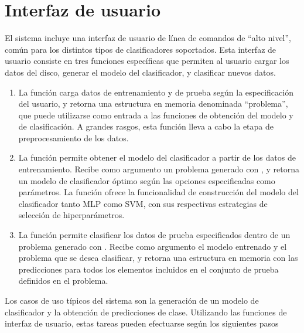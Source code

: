 %
%
%
\section{Interfaz de usuario}
%
El sistema incluye una interfaz de usuario de línea de comandos de
``alto nivel'', común para los distintos tipos de clasificadores
soportados.
Esta interfaz de usuario consiste en tres funciones específicas que
permiten al usuario cargar los datos del disco, generar el modelo del
clasificador, y clasificar nuevos datos.
%
\begin{enumerate}
\item
  La función  carga datos de entrenamiento y de
  prueba según la especificación del usuario, y retorna una estructura
  en memoria denominada ``problema'', que puede utilizarse como
  entrada a las funciones de obtención del modelo y de clasificación.
  A grandes rasgos, esta función lleva a cabo la etapa de
  preprocesamiento de los datos.
\item
  La función  permite obtener el modelo del
  clasificador a partir de los datos de entrenamiento.
  Recibe como argumento un problema generado con ,
  y retorna un modelo de clasificador óptimo según las opciones
  especificadas como parámetros.
  La función ofrece la funcionalidad de construcción del modelo del
  clasificador tanto MLP como SVM, con sus respectivas estrategias de
  selección de hiperparámetros.
\item
  La función  permite clasificar los datos de
  prueba especificados dentro de un problema generado con
  .
  Recibe como argumento el modelo entrenado y el problema que se desea
  clasificar, y retorna una estructura en memoria con las predicciones
  para todos los elementos incluidos en el conjunto de prueba
  definidos en el problema.
\end{enumerate}
%
Los casos de uso típicos del sistema son la generación de un modelo de
clasificador y la obtención de predicciones de clase.
Utilizando las funciones de interfaz de usuario, estas tareas pueden
efectuarse según los siguientes pasos
